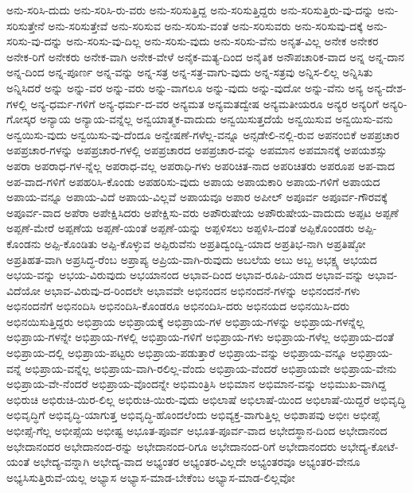 {ಅನು-ಸರಿಸಿ-ದುದು
ಅನು-ಸರಿಸಿ-ರು-ವರು
ಅನು-ಸರಿಸುತ್ತಿದ್ದ
ಅನು-ಸರಿಸುತ್ತಿದ್ದರು
ಅನು-ಸರಿಸುತ್ತಿರು-ವು-ದನ್ನು
ಅನು-ಸರಿಸುತ್ತೇನೆ
ಅನು-ಸರಿಸುತ್ತೇವೆ
ಅನು-ಸರಿಸುವ
ಅನು-ಸರಿಸು-ವಂತೆ
ಅನು-ಸರಿಸುವರು
ಅನು-ಸರಿಸುವು-ದಕ್ಕೆ
ಅನು-ಸರಿಸು-ವು-ದನ್ನು
ಅನು-ಸರಿಸು-ವು-ದಿಲ್ಲ
ಅನು-ಸರಿಸು-ವುದು
ಅನು-ಸರಿಸು-ವೆನು
ಅನೃತ-ವಿಲ್ಲ
ಅನೇಕ
ಅನೇಕರ
ಅನೇಕ-ರಿಗೆ
ಅನೇಕರು
ಅನೇಕ-ವಾಗಿ
ಅನೇಕ-ವೇಳೆ
ಅನೈಕ-ಮತ್ಯ-ದಿಂದ
ಅನೈತಿಕ
ಅನೌಪಚಾರಿಕ-ವಾದ
ಅನ್ನ
ಅನ್ನ-ದಾನ
ಅನ್ನ-ದಿಂದ
ಅನ್ನ-ಪೂರ್ಣ
ಅನ್ನ-ವನ್ನು
ಅನ್ನ-ಸತ್ರ
ಅನ್ನ-ಸತ್ರ-ವಾಗು-ವುದು
ಅನ್ನ-ಸತ್ರವು
ಅನ್ನಿಸ-ಲಿಲ್ಲ
ಅನ್ನಿಸಿತು
ಅನ್ನಿಸಿದರೆ
ಅನ್ನು
ಅನ್ನು-ವರ
ಅನ್ನು-ವರು
ಅನ್ನು-ವಾಗಲೂ
ಅನ್ನು-ವುದು
ಅನ್ನು-ವುದೋ
ಅನ್ನು-ವೆನು
ಅನ್ಯ
ಅನ್ಯ-ದೇಶ-ಗಳಲ್ಲಿ
ಅನ್ಯ-ಧರ್ಮ-ಗಳಿಗೆ
ಅನ್ಯ-ಧರ್ಮ-ದ-ವರ
ಅನ್ಯಮತ
ಅನ್ಯಮತದ್ವೇಷ
ಅನ್ಯಮತೀಯರೂ
ಅನ್ಯರ
ಅನ್ಯರಿಗೆ
ಅನ್ಯರಿ-ಗೋಸ್ಕರ
ಅನ್ಯಾಯ
ಅನ್ಯಾಯ-ವನ್ನೆಲ್ಲ
ಅನ್ವಯಾತ್ಮಕ-ವಾದುದು
ಅನ್ವಯಿಸುತ್ತದೆಯೆ
ಅನ್ವಯಿಸುವ
ಅನ್ವಯಿಸು-ವನು
ಅನ್ವಯಿಸು-ವುದು
ಅನ್ವಯಿಸು-ವು-ದೆಂದೂ
ಅನ್ವೇಷಣೆ-ಗಳೆಲ್ಲ-ವನ್ನೂ
ಅನ್ಸಡೇಲಿ-ನಲ್ಲಿ-ರುವ
ಅಪನಂಬಿಕೆ
ಅಪಪ್ರಚಾರ
ಅಪಪ್ರಚಾರ-ಗಳನ್ನು
ಅಪಪ್ರಚಾರ-ಗಳಲ್ಲಿ
ಅಪಪ್ರಚಾರದ
ಅಪಪ್ರಚಾರ-ವನ್ನು
ಅಪಮಾನ
ಅಪಮಾನಕ್ಕೆ
ಅಪಯಶಸ್ಸು
ಅಪರಾ
ಅಪರಾಧ-ಗಳ-ನ್ನೆಲ್ಲ
ಅಪರಾಧ-ವಲ್ಲ
ಅಪರಾಧಿ-ಗಳು
ಅಪರಿಚಿತ-ನಾದ
ಅಪರಿಚಿತರು
ಅಪರೂಪ
ಅಪ-ವಾದ
ಅಪ-ವಾದ-ಗಳಿಗೆ
ಅಪಹರಿಸಿ-ಕೊಂಡು
ಅಪಹರಿಸು-ವುದು
ಅಪಾಯ
ಅಪಾಯಕಾರಿ
ಅಪಾಯ-ಗಳಿಗೆ
ಅಪಾಯದ
ಅಪಾಯ-ವನ್ನೂ
ಅಪಾಯ-ವಿದೆ
ಅಪಾಯ-ವಿಲ್ಲವೆ
ಅಪಾಯವೂ
ಅಪಾರ
ಅಪೀಲ್
ಅಪೂರ್ವ
ಅಪೂರ್ವ-ಗೌರವಕ್ಕೆ
ಅಪೂರ್ವ-ವಾದ
ಅಪೆರಾ
ಅಪೇಕ್ಷಿಸಿದರು
ಅಪೇಕ್ಷಿಸು-ವರು
ಅಪೌರುಷೇಯ
ಅಪೌರುಷೇಯ-ವಾದುದು
ಅಪ್ಪಟ
ಅಪ್ಪಣೆ
ಅಪ್ಪಣೆ-ಮೇರೆ
ಅಪ್ಪಣೆಯ
ಅಪ್ಪಣೆ-ಯಂತೆ
ಅಪ್ಪಣೆ-ಯನ್ನು
ಅಪ್ಪಳಿಸಲು
ಅಪ್ಪಳಿಸಿ-ದಂತೆ
ಅಪ್ಪಿಕೊಂಂಡರು
ಅಪ್ಪಿ-ಕೊಂಡನು
ಅಪ್ಪಿ-ಕೊಂಡಿತು
ಅಪ್ಪಿ-ಕೊಳ್ಳುವ
ಅಪ್ಪಿರುವೆನು
ಅಪ್ರತಿದ್ವಂದ್ವಿ-ಯಾದ
ಅಪ್ರತಿಭ-ನಾಗಿ
ಅಪ್ರತಿಷ್ಠೋ
ಅಪ್ರತಿಹತ-ವಾಗಿ
ಅಪ್ರಸಿದ್ಧ-ರೆಂಬ
ಅಪ್ರಾಪ್ಯ
ಅಪ್ರಿಯ-ವಾಗಿ-ರುವುದು
ಅಬಲೆಯ
ಅಬು
ಅಬ್ಬ
ಅಭಕ್ಷ್ಯ
ಅಭಯದ
ಅಭಯ-ವನ್ನು
ಅಭಯ-ವಿರುವುದು
ಅಭಯಾನಂದ
ಅಭಾವ-ದಿಂದ
ಅಭಾವ-ರೂಪಿ-ಯಾದ
ಅಭಾವ-ವನ್ನು
ಅಭಾವ-ವಿದೆಯೋ
ಅಭಾವ-ವಿರುವು-ದ-ರಿಂದಲೇ
ಅಭಾವವೇ
ಅಭಿನಂದನ
ಅಭಿನಂದನೆ-ಗಳನ್ನು
ಅಭಿನಂದನೆ-ಗಳು
ಅಭಿನಂದನೆಗೆ
ಅಭಿನಂದಿಸಿ
ಅಭಿನಂದಿಸಿ-ಕೊಂಡರೂ
ಅಭಿನಂದಿಸಿ-ದರು
ಅಭಿನಯದ
ಅಭಿನಯಿಸಿ-ದರು
ಅಭಿನಯಿಸುತ್ತಿದ್ದರು
ಅಭಿಪ್ರಾಯ
ಅಭಿಪ್ರಾಯಕ್ಕೆ
ಅಭಿಪ್ರಾಯ-ಗಳ
ಅಭಿಪ್ರಾಯ-ಗಳನ್ನು
ಅಭಿಪ್ರಾಯ-ಗಳನ್ನೆಲ್ಲ
ಅಭಿಪ್ರಾಯ-ಗಳನ್ನೇ
ಅಭಿಪ್ರಾಯ-ಗಳಲ್ಲಿ
ಅಭಿಪ್ರಾಯ-ಗಳಿಗೆ
ಅಭಿಪ್ರಾಯ-ಗಳು
ಅಭಿಪ್ರಾಯ-ಗಳೆಲ್ಲ
ಅಭಿಪ್ರಾಯ-ದಂತೆ
ಅಭಿಪ್ರಾಯ-ದಲ್ಲಿ
ಅಭಿಪ್ರಾಯ-ಪಟ್ಟರು
ಅಭಿಪ್ರಾಯ-ಪಡುತ್ತಾರೆ
ಅಭಿಪ್ರಾಯ-ವನ್ನು
ಅಭಿಪ್ರಾಯ-ವನ್ನೂ
ಅಭಿಪ್ರಾಯ-ವನ್ನೆ
ಅಭಿಪ್ರಾಯ-ವನ್ನೆಲ್ಲ
ಅಭಿಪ್ರಾಯ-ವಾಗಿ-ರಲಿಲ್ಲ-ವೆಂದು
ಅಭಿಪ್ರಾಯ-ವೆಂದರೆ
ಅಭಿಪ್ರಾಯವೇ
ಅಭಿಪ್ರಾಯ-ವೇನು
ಅಭಿಪ್ರಾಯ-ವೇ-ನೆಂದರೆ
ಅಭಿಪ್ರಾಯ-ವೊಂದನ್ನೇ
ಅಭಿಮಂತ್ರಿಸಿ
ಅಭಿಮಾನ
ಅಭಿಮಾನ-ವನ್ನು
ಅಭಿಮುಖ-ವಾಗಿದ್ದ
ಅಭಿರುಚಿ
ಅಭಿರುಚಿ-ಯಿರ-ಲಿಲ್ಲ
ಅಭಿರುಚಿ-ಯಿರು-ವುದು
ಅಭಿಲಾಷೆ
ಅಭಿಲಾಷೆ-ಯಿಂದ
ಅಭಿಲಾಷೆ-ಯಿದ್ದರೆ
ಅಭಿವೃದ್ಧಿ
ಅಭಿವೃದ್ಧಿಗೆ
ಅಭಿವೃದ್ಧಿ-ಯಾಗುತ್ತ
ಅಭಿವೃದ್ಧಿ-ಹೊಂದಲೆಂದು
ಅಭಿವ್ಯಕ್ತ-ವಾಗುತ್ತಿಲ್ಲ
ಅಭಿಶಾಪವು
ಅಭೀಃ
ಅಭೀಪ್ಸೆ
ಅಭೀಪ್ಸೆ-ಗೆಲ್ಲ
ಅಭೀಪ್ಸೆಯ
ಅಭೀಷ್ಟ
ಅಭೂತ-ಪೂರ್ವ
ಅಭೂತ-ಪೂರ್ವ-ವಾದ
ಅಭೇದಸ್ಥಾನ-ದಿಂದ
ಅಭೇದಾನಂದ
ಅಭೇದಾನಂದರ
ಅಭೇದಾನಂದ-ರನ್ನು
ಅಭೇದಾನಂದ-ರಿಗೂ
ಅಭೇದಾನಂದ-ರಿಗೆ
ಅಭೇದಾನಂದರು
ಅಭೇದ್ಯ-ಕೋಟೆ-ಯಂತೆ
ಅಭೇದ್ಯ-ವನ್ನಾಗಿ
ಅಭೇದ್ಯ-ವಾದ
ಅಭ್ಯಂತರ
ಅಭ್ಯಂತರ-ವಿಲ್ಲದೇ
ಅಭ್ಯಂತರವೂ
ಅಭ್ಯಂತರ-ವೇನೂ
ಅಭ್ಯಸಿಸುತ್ತಿರುವೆ-ಯಲ್ಲ
ಅಭ್ಯಾಸ
ಅಭ್ಯಾಸ-ಮಾಡ-ಬೇಕೆಂಬ
ಅಭ್ಯಾಸ-ಮಾಡ-ಲಿಲ್ಲವೋ
}
